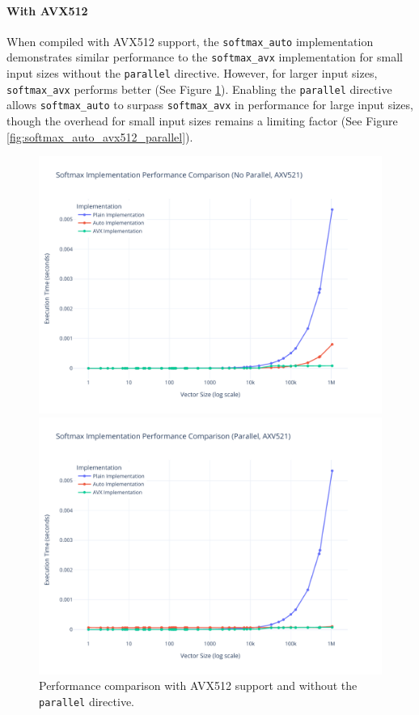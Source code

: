 \documentclass[10pt]{article}
\begin{document}
\paragraph{With AVX512} When compiled with AVX512 support, the \texttt{softmax\_auto} implementation demonstrates similar performance to the \texttt{softmax\_avx} implementation for small input sizes without the \texttt{parallel} directive. However, for larger input sizes, \texttt{softmax\_avx} performs better (See Figure \ref{fig:softmax_auto_avx512_no_parallel}). Enabling the \texttt{parallel} directive allows \texttt{softmax\_auto} to surpass \texttt{softmax\_avx} in performance for large input sizes, though the overhead for small input sizes remains a limiting factor (See Figure \ref{fig:softmax_auto_avx512_parallel}).

\clearpage
\begin{figure}[ht!]
  \centering
  \begin{minipage}{0.49\textwidth}
    \centering
    \includegraphics[width=\linewidth]{../images/softmax_noparallel_axv521.pdf}
    \caption{Performance comparison with AVX512 support and without the \texttt{parallel} directive.}
    \label{fig:softmax_auto_avx512_no_parallel}
  \end{minipage}%
  \hfill
  \begin{minipage}{0.49\textwidth}
    \centering
    \includegraphics[width=\linewidth]{../images/softmax_parallel_axv521.pdf}

\end{minipage}
\end{figure}
\end{document}
